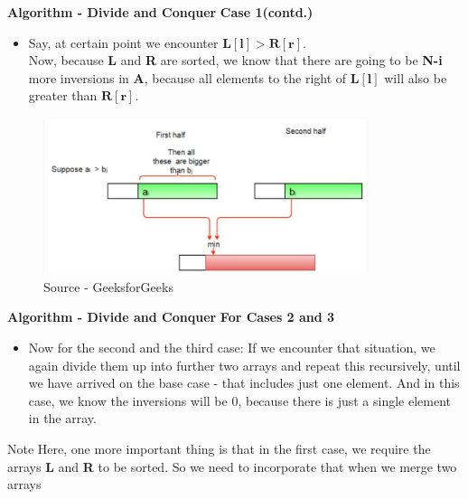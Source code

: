 \documentclass{beamer}
\begin{document}
\begin{frame}{\textbf{Algorithm - Divide and Conquer}}
\textbf{Case 1(contd.)}
\begin{itemize}
    \item Say, at certain point we encounter $\bm{L[l]} > \bm{R[r]}$.\\
    Now, because \textbf{L} and \textbf{R} are sorted, we know that there are going to be \textbf{N-i} more inversions in \textbf{A}, because all elements to the right of $\bm{L[l]}$ will also be greater than $\bm{R[r]}$.\\
    
\end{itemize}
\begin{figure}[htbp]
     \includegraphics[width=0.85\textwidth]{mergeExplain.png}\\
    \tiny{Source - GeeksforGeeks}
    
    \label{explanation}
\end{figure}
\end{frame}

\begin{frame}{\textbf{Algorithm - Divide and Conquer}}
\textbf{For Cases 2 and 3}
\begin{itemize}
     \item Now for the second and the third case: If we encounter that situation, we again divide them up into further two arrays and repeat this recursively, until we have arrived on the base case - that includes just one element. And in this case, we know the inversions will be $0$, because there is just a single element in the array.
\end{itemize}

\begin{block}{Note}
Here, one more important thing is that in the first case, we require the arrays \textbf{L} and \textbf{R} to be sorted. So we need to incorporate that when we merge two arrays
\end{block}
\end{frame}
\end{document}
